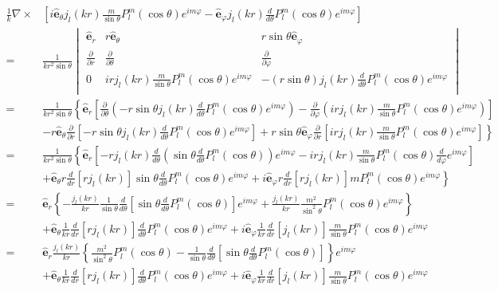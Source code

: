 \documentclass[a4paper,10pt]{article}
\newcommand{\hatbf}[1] {\hat{\mathbf{#1}}}	%
\newcommand{\parcial}[1]{\frac{\partial}{\partial {#1}}}	%
\begin{document}
\begin{subequations}
\begin{align}
\frac{1}{k}\nabla\times&\left[i\hatbf{e}_{\theta}j_l(kr)\frac{m}{\sin\theta}P_l^m(\cos\theta) e^{im\varphi}-\hatbf{e}_{\varphi}j_l(kr)\frac{d}{d\theta}P_l^m(\cos\theta)e^{im\varphi}\right]	\\
=&\frac{1}{kr^2\sin\theta}
\begin{vmatrix}
\hatbf{e}_r	&	r\hatbf{e}_{\theta}	&	r\sin\theta\hatbf{e}_{\varphi}	\\
\parcial{r}		&	\parcial{\theta}		&	\parcial{\varphi}						\\
0	&	irj_l(kr)\frac{m}{\sin\theta}P_l^m(\cos\theta)e^{im\varphi}	&	-(r\sin\theta)j_l(kr)\frac{d}{d\theta}P_l^m(\cos\theta)e^{im\varphi}	\\
\end{vmatrix}	\\
=&\frac{1}{kr^2\sin\theta}\left\{\hatbf{e}_r\left[\parcial{\theta}\left(-r\sin\theta j_l(kr)\frac{d}{d\theta}P_l^m(\cos\theta)e^{im\varphi}\right)-\parcial{\varphi}\left( irj_l(kr)\frac{m}{\sin\theta}P_l^m(\cos\theta)e^{im\varphi} \right)\right]\right.	\\
&\left. -r\hatbf{e}_{\theta}\parcial{r}\left[-r\sin\theta j_l(kr)\frac{d}{d\theta}P_l^m(\cos\theta)e^{im\varphi}\right]
+r\sin\theta\hatbf{e}_{\varphi}\parcial{r}\left[ irj_l(kr)\frac{m}{\sin\theta}P_l^m(\cos\theta)e^{im\varphi}\right]\right\}	\\
=&\frac{1}{kr^2\sin\theta}\left\{\hatbf{e}_r\left[-rj_l(kr)\frac{d}{d\theta}\left(\sin\theta\frac{d}{d\theta}P_l^m(\cos\theta)\right)e^{im\varphi}-irj_l(kr)\frac{m}{\sin\theta}P_l^m(\cos\theta)\frac{d}{d\varphi}e^{im\varphi}\right]\right.	\\
&\left. +\hatbf{e}_{\theta}r\frac{d}{dr}\left[rj_l(kr)\right]\sin\theta\frac{d}{d\theta}P_l^m(\cos\theta)e^{im\varphi}
+i\hatbf{e}_{\varphi}r\frac{d}{dr}\left[rj_l(kr)\right]mP_l^m(\cos\theta)e^{im\varphi}\right\}	\\
=&\hatbf{e}_r\left\{-\frac{j_l(kr)}{kr}\frac{1}{\sin\theta}\frac{d}{d\theta}\left[\sin\theta\frac{d}{d\theta}P_l^m(\cos\theta)\right]e^{im\varphi}+\frac{j_l(kr)}{kr}\frac{m^2}{\sin^2\theta}P_l^m(\cos\theta)e^{im\varphi}\right\}\\
&+\hatbf{e}_{\theta}\frac{1}{kr}\frac{d}{dr}\left[rj_l(kr)\right]\frac{d}{d\theta}P_l^m(\cos\theta)e^{im\varphi}
+i\hatbf{e}_{\varphi}\frac{1}{kr}\frac{d}{dr}\left[j_l(kr)\right]\frac{m}{\sin\theta}P_l^m(\cos\theta)e^{im\varphi}	\\
=&\hatbf{e}_r\frac{j_l(kr)}{kr}\left\{\frac{m^2}{\sin^2\theta}P_l^m(\cos\theta)-\frac{1}{\sin\theta}\frac{d}{d\theta}\left[\sin\theta\frac{d}{d\theta}P_l^m(\cos\theta)\right]\right\}e^{im\varphi}\\
&+\hatbf{e}_{\theta}\frac{1}{kr}\frac{d}{dr}\left[rj_l(kr)\right]\frac{d}{d\theta}P_l^m(\cos\theta)e^{im\varphi}
+i\hatbf{e}_{\varphi}\frac{1}{kr}\frac{d}{dr}\left[j_l(kr)\right]\frac{m}{\sin\theta}P_l^m(\cos\theta)e^{im\varphi}
\end{align}
\label{Eq4.5}
\end{subequations}
\end{document}
